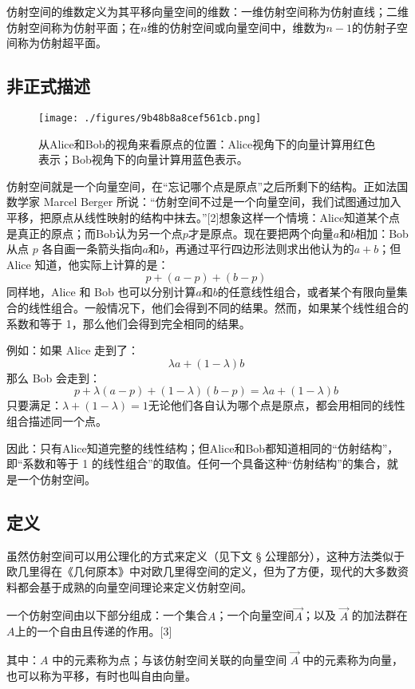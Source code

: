 仿射空间的维数定义为其平移向量空间的维数：一维仿射空间称为仿射直线；二维仿射空间称为仿射平面；在$n$维的仿射空间或向量空间中，维数为$n-1$的仿射子空间称为仿射超平面。
\subsection{非正式描述}
\begin{figure}[ht]
\centering
\texttt{[image: ./figures/9b48b8a8cef561cb.png]}
\caption{从Alice和Bob的视角来看原点的位置：Alice视角下的向量计算用红色表示；Bob视角下的向量计算用蓝色表示。} \label{fig_FSKJ_2}
\end{figure}
仿射空间就是一个向量空间，在“忘记哪个点是原点”之后所剩下的结构。正如法国数学家 Marcel Berger 所说：“仿射空间不过是一个向量空间，我们试图通过加入平移，把原点从线性映射的结构中抹去。”[2]想象这样一个情境：Alice知道某个点是真正的原点；而Bob认为另一个点$p$才是原点。现在要把两个向量$a$和$b$相加：Bob 从点 $p$ 各自画一条箭头指向$a$和$b$，再通过平行四边形法则求出他认为的$a + b$；但 Alice 知道，他实际上计算的是：
$$
p + (a - p) + (b - p)~
$$
同样地，Alice 和 Bob 也可以分别计算$a$和$b$的任意线性组合，或者某个有限向量集合的线性组合。一般情况下，他们会得到不同的结果。然而，如果某个线性组合的系数和等于 1，那么他们会得到完全相同的结果。

例如：如果 Alice 走到了：
$$
\lambda a + (1 - \lambda)b~
$$
那么 Bob 会走到：
$$
p + \lambda(a - p) + (1 - \lambda)(b - p) = \lambda a + (1 - \lambda)b~
$$
只要满足：$\lambda + (1 - \lambda) = 1$无论他们各自认为哪个点是原点，都会用相同的线性组合描述同一个点。

因此：只有Alice知道完整的线性结构；但Alice和Bob都知道相同的“仿射结构”，即“系数和等于 1 的线性组合”的取值。任何一个具备这种“仿射结构”的集合，就是一个仿射空间。
\subsection{定义}
虽然仿射空间可以用公理化的方式来定义（见下文 § 公理部分），这种方法类似于欧几里得在《几何原本》中对欧几里得空间的定义，但为了方便，现代的大多数资料都会基于成熟的向量空间理论来定义仿射空间。

一个仿射空间由以下部分组成：一个集合$A$；一个向量空间$\overrightarrow{A}$；以及 $\overrightarrow{A}$ 的加法群在$A$上的一个自由且传递的作用。[3]

其中：$A$ 中的元素称为点；与该仿射空间关联的向量空间 $\overrightarrow{A}$ 中的元素称为向量，也可以称为平移，有时也叫自由向量。

